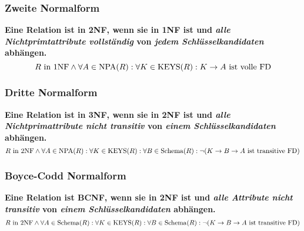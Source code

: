            \subsubsection{Zweite Normalform} %
                \textbf{Eine Relation ist in 2NF, wenn sie in 1NF ist und \textit{alle Nichtprimtattribute vollständig} von \textit{jedem Schlüsselkandidaten} abhängen.}
                \begin{equation*}
                    R \text{ in 1NF} \land \forall A \in \text{NPA}(R) : \forall K \in \operatorname{KEYS}(R) : K \rightarrow A \text{ ist volle FD}
                \end{equation*}
                

            \subsubsection{Dritte Normalform} %
                \textbf{Eine Relation ist in 3NF, wenn sie in 2NF ist und \textit{alle Nichtprimattribute nicht transitiv} von \textit{einem Schlüsselkandidaten} abhängen.}
                \begin{equation*}
                    R \text{ in 2NF} \land \forall A \in \text{NPA}(R) : \forall K \in \operatorname{KEYS}(R) : \forall B \in \operatorname{Schema}(R) : \lnot(K \rightarrow B \rightarrow A \text{ ist transitive FD})
                \end{equation*}
                

            \subsubsection{Boyce-Codd Normalform} %
                \textbf{Eine Relation ist BCNF, wenn sie in 2NF ist und \textit{alle Attribute nicht transitiv} von \textit{einem Schlüsselkandidaten} abhängen.}
                \begin{equation*}
                    R \text{ in 2NF} \land \forall A \in \operatorname{Schema}(R) : \forall K \in \operatorname{KEYS}(R) : \forall B \in \operatorname{Schema}(R) : \lnot(K \rightarrow B \rightarrow A \text{ ist transitive FD})
                \end{equation*}
                

